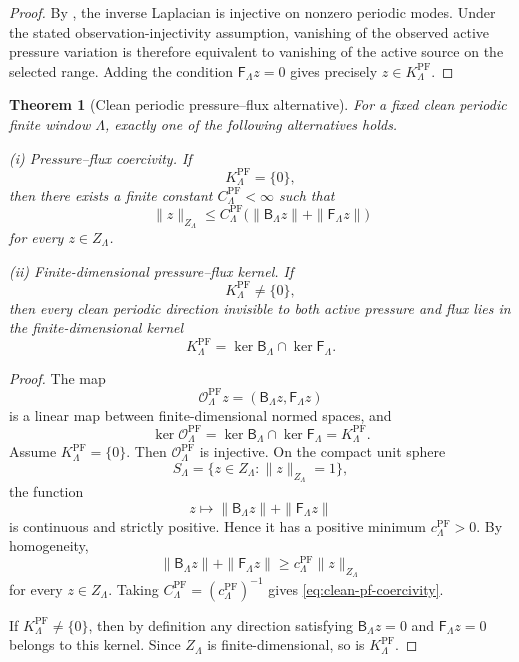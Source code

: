 \documentclass[11pt]{article}
\numberwithin{equation}{section}
\theoremstyle{plain}
\newtheorem{theorem}{Theorem}[section]
\theoremstyle{definition}
\theoremstyle{remark}
\newcommand{\PF}{\mathrm{PF}}
\newcommand{\calO}{\mathcal O}
\newcommand{\Bop}{\mathsf B}
\newcommand{\Fop}{\mathsf F}
\begin{document}
\begin{proof}
By , the inverse Laplacian is injective on nonzero periodic modes.  Under the stated observation-injectivity assumption, vanishing of the observed active pressure variation is therefore equivalent to vanishing of the active source on the selected range.  Adding the condition \(\Fop_\Lambda z=0\) gives precisely \(z\in K^{\PF}_\Lambda\).
\end{proof}

\begin{theorem}[Clean periodic pressure--flux alternative]
\label{thm:clean-periodic-pressure-flux-alternative}
For a fixed clean periodic finite window \(\Lambda\), exactly one of the following alternatives holds.

\smallskip
\noindent\textup{(i) Pressure--flux coercivity.}
If
\[
        K^{\PF}_\Lambda=\{0\},
\]
then there exists a finite constant \(C^{\PF}_\Lambda<\infty\) such that
\begin{equation}
        \|z\|_{Z_\Lambda}
        \le
        C^{\PF}_\Lambda
        \bigl(
            \|\Bop_\Lambda z\|+\|\Fop_\Lambda z\|
        \bigr)
        \label{eq:clean-pf-coercivity}
\end{equation}
for every \(z\in Z_\Lambda\).

\smallskip
\noindent\textup{(ii) Finite-dimensional pressure--flux kernel.}
If
\[
        K^{\PF}_\Lambda\neq\{0\},
\]
then every clean periodic direction invisible to both active pressure and flux lies in the finite-dimensional kernel
\[
        K^{\PF}_\Lambda=
        \ker\Bop_\Lambda\cap\ker\Fop_\Lambda.
\]
\end{theorem}

\begin{proof}
The map
\[
        \calO^{\PF}_\Lambda z=(\Bop_\Lambda z,\Fop_\Lambda z)
\]
is a linear map between finite-dimensional normed spaces, and
\[
        \ker\calO^{\PF}_\Lambda
        =
        \ker\Bop_\Lambda\cap\ker\Fop_\Lambda
        =
        K^{\PF}_\Lambda.
\]
Assume \(K^{\PF}_\Lambda=\{0\}\).  Then \(\calO^{\PF}_\Lambda\) is injective.  On the compact unit sphere
\[
        S_\Lambda=\{z\in Z_\Lambda:\|z\|_{Z_\Lambda}=1\},
\]
the function
\[
        z\mapsto \|\Bop_\Lambda z\|+\|\Fop_\Lambda z\|
\]
is continuous and strictly positive.  Hence it has a positive minimum \(c^{\PF}_\Lambda>0\).  By homogeneity,
\[
        \|\Bop_\Lambda z\|+\|\Fop_\Lambda z\|
        \ge
        c^{\PF}_\Lambda\|z\|_{Z_\Lambda}
\]
for every \(z\in Z_\Lambda\).  Taking \(C^{\PF}_\Lambda=(c^{\PF}_\Lambda)^{-1}\) gives \eqref{eq:clean-pf-coercivity}.

If \(K^{\PF}_\Lambda\neq\{0\}\), then by definition any direction satisfying \(\Bop_\Lambda z=0\) and \(\Fop_\Lambda z=0\) belongs to this kernel.  Since \(Z_\Lambda\) is finite-dimensional, so is \(K^{\PF}_\Lambda\).
\end{proof}
\end{document}
